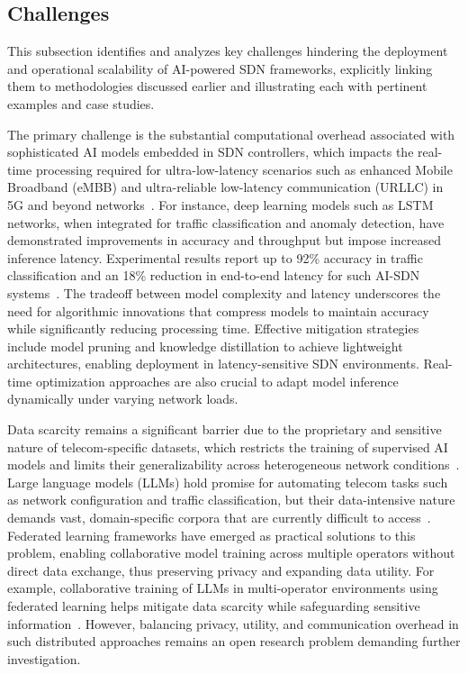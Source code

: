 \documentclass[sigconf]{acmart}
\begin{document}
\subsection{Challenges}

This subsection identifies and analyzes key challenges hindering the deployment and operational scalability of AI-powered SDN frameworks, explicitly linking them to methodologies discussed earlier and illustrating each with pertinent examples and case studies.

The primary challenge is the substantial computational overhead associated with sophisticated AI models embedded in SDN controllers, which impacts the real-time processing required for ultra-low-latency scenarios such as enhanced Mobile Broadband (eMBB) and ultra-reliable low-latency communication (URLLC) in 5G and beyond networks~\cite{ref52}. For instance, deep learning models such as LSTM networks, when integrated for traffic classification and anomaly detection, have demonstrated improvements in accuracy and throughput but impose increased inference latency. Experimental results report up to 92\% accuracy in traffic classification and an 18\% reduction in end-to-end latency for such AI-SDN systems~\cite{ref52}. The tradeoff between model complexity and latency underscores the need for algorithmic innovations that compress models to maintain accuracy while significantly reducing processing time. Effective mitigation strategies include model pruning and knowledge distillation to achieve lightweight architectures, enabling deployment in latency-sensitive SDN environments. Real-time optimization approaches are also crucial to adapt model inference dynamically under varying network loads.

Data scarcity remains a significant barrier due to the proprietary and sensitive nature of telecom-specific datasets, which restricts the training of supervised AI models and limits their generalizability across heterogeneous network conditions~\cite{ref7}. Large language models (LLMs) hold promise for automating telecom tasks such as network configuration and traffic classification, but their data-intensive nature demands vast, domain-specific corpora that are currently difficult to access~\cite{ref7}. Federated learning frameworks have emerged as practical solutions to this problem, enabling collaborative model training across multiple operators without direct data exchange, thus preserving privacy and expanding data utility. For example, collaborative training of LLMs in multi-operator environments using federated learning helps mitigate data scarcity while safeguarding sensitive information~\cite{ref7}. However, balancing privacy, utility, and communication overhead in such distributed approaches remains an open research problem demanding further investigation.
\end{document}
